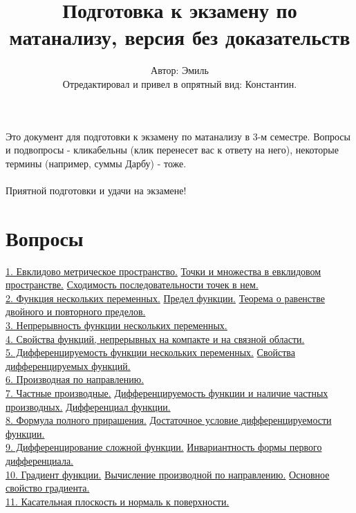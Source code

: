 \documentclass[12pt]{article}
\title{Подготовка к экзамену по матанализу, версия без доказательств}
\author{Автор: Эмиль\\
\small{Отредактировал и привел в опрятный вид: Константин.}}
\begin{document}

\maketitle
Это документ для подготовки к экзамену по матанализу в 3-м семестре. Вопросы и подвопросы - кликабельны (клик перенесет вас к ответу на него), некоторые термины (например, суммы Дарбу) - тоже.\\\\
Приятной подготовки и удачи на экзамене!\\

\section{Вопросы}
\hyperref[question1_1]{1.	Евклидово метрическое пространство.} \hyperref[question1_2]{Точки и множества в евклидовом пространстве.} \hyperref[question1_3]{Сходимость последовательности точек в нем.}\\
\hyperref[question2_1]{2.	Функция нескольких переменных.} \hyperref[question2_2]{Предел функции.} \hyperref[question2_3]{Теорема о равенстве двойного и повторного пределов.}\\
\hyperref[question3]{3.	Непрерывность функции нескольких переменных.}\\
\hyperref[question4]{4.	Свойства функций, непрерывных на компакте и на связной области.}\\
\hyperref[question5_1]{5.	Дифференцируемость функции нескольких переменных.} \hyperref[question5_2]{Свойства дифференцируемых функций.}\\
\hyperref[question6]{6.	Производная по направлению.}\\
\hyperref[question7_1]{7.	Частные производные.} \hyperref[question7_2]{Дифференцируемость функции и наличие частных производных.} \hyperref[question7_3]{Дифференциал функции.}\\
\hyperref[question8_1]{8.	Формула полного приращения.} \hyperref[question8_2]{Достаточное условие дифференцируемости функции.}\\
\hyperref[question9_1]{9.	Дифференцирование сложной функции.} \hyperref[question9_2]{Инвариантность формы первого дифференциала.}\\
\hyperref[question10_1]{10.	Градиент функции.} \hyperref[question10_2]{Вычисление производной по направлению.} \hyperref[question10_3]{Основное свойство градиента.}\\
\hyperref[question11]{11.	Касательная плоскость и нормаль к поверхности.}\\
\end{document}
